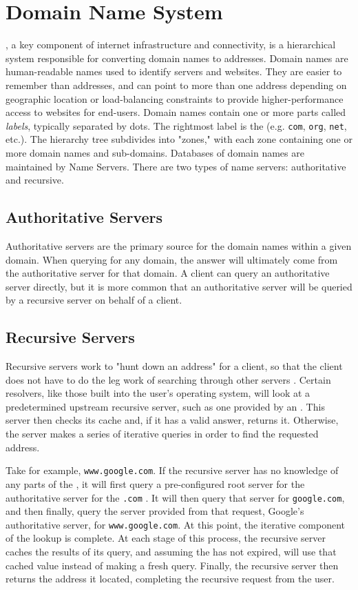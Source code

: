 \section{Domain Name System}\label{sec:background_dns}
\dns, a key component of internet infrastructure and connectivity, is a hierarchical system responsible for converting domain names to \ip addresses. Domain names are human-readable names used to identify servers and websites. They are easier to remember than \ip addresses, and can point to more than one \ip address depending on geographic location or load-balancing constraints to provide higher-performance access to websites for end-users. Domain names contain one or more parts called \textit{labels}, typically separated by dots. The rightmost label is the \tld (e.g. \texttt{com}, \texttt{org}, \texttt{net}, etc.). The \dns hierarchy tree subdivides into "zones," with each zone containing one or more domain names and sub-domains. Databases of domain names are maintained by \dns Name Servers. There are two types of name servers: authoritative and recursive.

\subsection{Authoritative Servers}
Authoritative servers are the primary source for the domain names within a given domain. When querying for any domain, the answer will ultimately come from the authoritative server for that domain. A \dns client can query an authoritative server directly, but it is more common that an authoritative server will be queried by a recursive server on behalf of a \dns client.

\subsection{Recursive Servers}
Recursive \dns servers work to "hunt down an \ip address" for a client, so that the client does not have to do the leg work of searching through other \dns servers \cite{CloudflareWhatDNS}. Certain \dns resolvers, like those built into the user's operating system, will look at a predetermined upstream recursive \dns server, such as one provided by an \isp \cite{OracleRecursiveWork}. This server then checks its cache and, if it has a valid answer, returns it. Otherwise, the server makes a series of iterative queries in order to find the requested \ip address. 

Take for example, \texttt{www.google.com}. If the recursive server has no knowledge of any parts of the \acUrl, it will first query a pre-configured root \dns server for the authoritative server for the \texttt{.com} \tld. It will then query that server for \texttt{google.com}, and then finally, query the server provided from that request, Google's authoritative \dns server, for \texttt{www.google.com}. At this point, the iterative component of the lookup is complete. At each stage of this process, the recursive server caches the results of its query, and assuming the \ttl has not expired, will use that cached value instead of making a fresh query. Finally, the recursive server then returns the \ip address it located, completing the recursive request from the user.

